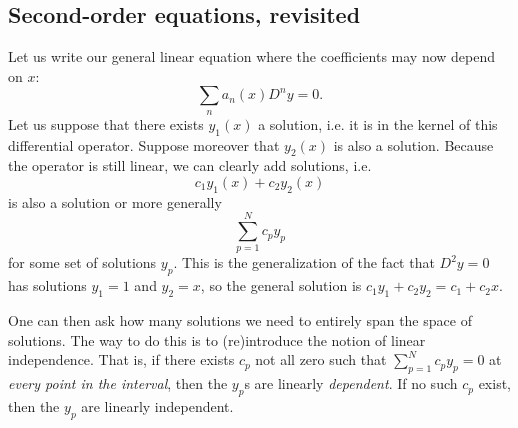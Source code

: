 \subsection*{Second-order equations, revisited}
Let us write our general linear equation where the coefficients may now depend on $x$:
\begin{equation}
    \sum_n a_n(x) D^n y =0.
\end{equation}
Let us suppose that there exists $y_1(x)$ a solution, i.e. it is in the kernel of this differential operator. Suppose moreover that $y_2(x)$ is also a solution. Because the operator is still linear, we can clearly add solutions, i.e.
\begin{equation}
     c_1 y_1(x) + c_2 y_2(x)
\end{equation}
is also a solution or more generally
\begin{equation}
    \sum_{p=1}^N c_p y_p
\end{equation}
for some set of solutions $y_p$. This is the generalization of the fact that $D^2y=0$ has solutions $y_1=1$ and $y_2=x$, so the general solution is $c_1 y_1 + c_2 y_2 = c_1 + c_2x$.

One can then ask how many solutions we need to entirely span the space of solutions. The way to do this is to (re)introduce the notion of linear independence. That is, if there exists $c_p$ not all zero such that $\sum_{p=1}^N c_p y_p=0$ at \emph{every point in the interval}, then the $y_p$s are linearly \emph{dependent}. If no such $c_p$ exist, then the $y_p$ are linearly independent.

